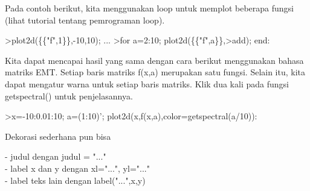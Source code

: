 \documentclass[a4paper,10pt]{article}
\begin{document}
\begin{eulernotebook}
\begin{eulercomment}
\begin{eulercomment}
\begin{eulercomment}
\begin{eulercomment}
\begin{eulercomment}
\begin{eulercomment}
\begin{eulercomment}
\begin{eulercomment}
\begin{eulercomment}
\begin{eulercomment}
\begin{eulercomment}
\begin{eulercomment}
\begin{eulercomment}
\begin{eulercomment}
\begin{eulercomment}
\begin{eulercomment}
\begin{eulercomment}
\begin{eulercomment}
\begin{eulercomment}
\begin{eulercomment}
\begin{eulercomment}
\begin{eulercomment}
\begin{eulercomment}
\begin{eulercomment}
\begin{eulercomment}
\begin{eulercomment}
\begin{eulercomment}
\begin{eulercomment}
\begin{eulercomment}
\begin{eulercomment}
\begin{eulercomment}
\begin{eulercomment}
\begin{eulercomment}
\begin{eulercomment}
\begin{eulercomment}
\begin{eulercomment}
\begin{eulercomment}
Pada contoh berikut, kita menggunakan loop untuk memplot beberapa
fungsi (lihat tutorial tentang pemrograman loop).
\end{eulercomment}
\begin{eulerprompt}
>plot2d(\{\{"f",1\}\},-10,10); ...
>for a=2:10; plot2d(\{\{"f",a\}\},>add); end:
\end{eulerprompt}
\begin{eulercomment}
Kita dapat mencapai hasil yang sama dengan cara berikut menggunakan
bahasa matriks EMT. Setiap baris matriks f(x,a) merupakan satu fungsi.
Selain itu, kita dapat mengatur warna untuk setiap baris matriks. Klik
dua kali pada fungsi getspectral() untuk penjelasannya.
\end{eulercomment}
\begin{eulerprompt}
>x=-10:0.01:10; a=(1:10)'; plot2d(x,f(x,a),color=getspectral(a/10)):
\end{eulerprompt}
\begin{eulercomment}
Dekorasi sederhana pun bisa

- judul dengan judul = "..."\\
- label x dan y dengan xl="...", yl="..."\\
- label teks lain dengan label("...",x,y)


\end{eulercomment}
\end{eulercomment}
\end{eulercomment}
\end{eulercomment}
\end{eulercomment}
\end{eulercomment}
\end{eulercomment}
\end{eulercomment}
\end{eulercomment}
\end{eulercomment}
\end{eulercomment}
\end{eulercomment}
\end{eulercomment}
\end{eulercomment}
\end{eulercomment}
\end{eulercomment}
\end{eulercomment}
\end{eulercomment}
\end{eulercomment}
\end{eulercomment}
\end{eulercomment}
\end{eulercomment}
\end{eulercomment}
\end{eulercomment}
\end{eulercomment}
\end{eulercomment}
\end{eulercomment}
\end{eulercomment}
\end{eulercomment}
\end{eulercomment}
\end{eulercomment}
\end{eulercomment}
\end{eulercomment}
\end{eulercomment}
\end{eulercomment}
\end{eulercomment}
\end{eulercomment}
\end{eulernotebook}
\end{document}
